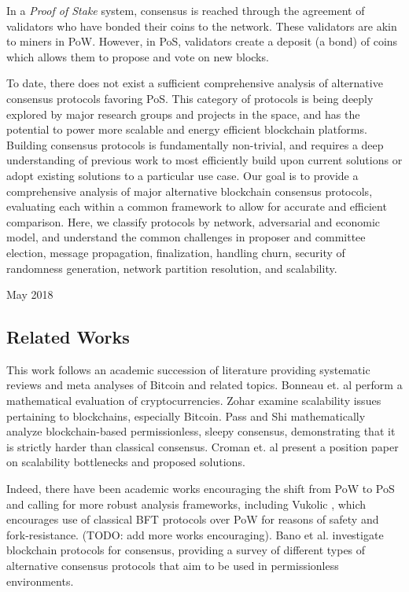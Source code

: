 \documentclass[10pt,journal,compsoc]{IEEEtran}
\begin{document}
In a \emph{Proof of Stake} system, consensus is reached through the agreement of validators who have bonded their coins to the network. These validators are akin to miners in PoW. However, in PoS, validators create a deposit (a bond) of coins which allows them to propose and vote on new blocks. 

To date, there does not exist a sufficient comprehensive analysis of alternative consensus protocols favoring PoS. This category of protocols is being deeply explored by major research groups and projects in the space, and has the potential to power more scalable and energy efficient blockchain platforms. Building consensus protocols is fundamentally non-trivial, and requires a deep understanding of previous work to most efficiently build upon current solutions or adopt existing solutions to a particular use case. Our goal is to provide a comprehensive analysis of major alternative blockchain consensus protocols, evaluating each within a common framework to allow for accurate and efficient comparison. Here, we classify protocols by network, adversarial and economic model, and understand the common challenges in proposer and committee election, message propagation, finalization, handling churn, security of randomness generation, network partition resolution, and scalability. 

\hfill 
 
\hfill May 2018


\subsection{Related Works}
This work follows an academic succession of literature providing systematic reviews and meta analyses of Bitcoin and related topics. Bonneau et. al \cite{Bonneau} perform a mathematical evaluation of cryptocurrencies. Zohar \cite{Zohar} examine scalability issues pertaining to blockchains, especially Bitcoin. Pass and Shi \cite{Rethinking} mathematically analyze blockchain-based permissionless, sleepy consensus, demonstrating that it is strictly harder than classical consensus. Croman et. al \cite{CromanEtAl} present a position paper on scalability bottlenecks and proposed solutions. 

Indeed, there have been academic works encouraging the shift from PoW to PoS and calling for more robust analysis frameworks, including Vukolic \cite{Vukolic}, which encourages use of classical BFT protocols over PoW for reasons of safety and fork-resistance. (TODO: add more works encouraging). Bano et al. \cite{Bano} investigate blockchain  protocols for consensus, providing a survey of different types of alternative consensus protocols that aim to be used in permissionless environments.
\end{document}
